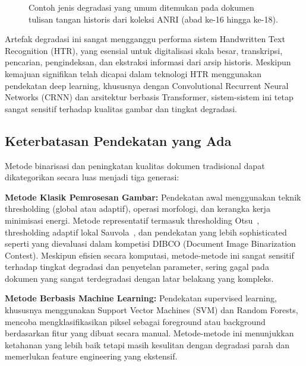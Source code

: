 \documentclass[journal]{IEEEtran}
\begin{document}
\begin{figure}[!t]
\centering
\caption{Contoh jenis degradasi yang umum ditemukan pada dokumen tulisan tangan historis dari koleksi ANRI (abad ke-16 hingga ke-18).}
\label{fig:degradation_examples}
\end{figure}

Artefak degradasi ini sangat mengganggu performa sistem Handwritten Text Recognition (HTR), yang esensial untuk digitalisasi skala besar, transkripsi, pencarian, pengindeksan, dan ekstraksi informasi dari arsip historis. Meskipun kemajuan signifikan telah dicapai dalam teknologi HTR menggunakan pendekatan deep learning, khususnya dengan Convolutional Recurrent Neural Networks (CRNN) dan arsitektur berbasis Transformer, sistem-sistem ini tetap sangat sensitif terhadap kualitas gambar dan tingkat degradasi.

\subsection{Keterbatasan Pendekatan yang Ada}

Metode binarisasi dan peningkatan kualitas dokumen tradisional dapat dikategorikan secara luas menjadi tiga generasi:

\textbf{Metode Klasik Pemrosesan Gambar:} Pendekatan awal menggunakan teknik thresholding (global atau adaptif), operasi morfologi, dan kerangka kerja minimisasi energi. Metode representatif termasuk thresholding Otsu~\cite{otsu1979threshold}, thresholding adaptif lokal Sauvola~\cite{sauvola2000adaptive}, dan pendekatan yang lebih sophisticated seperti yang dievaluasi dalam kompetisi DIBCO (Document Image Binarization Contest). Meskipun efisien secara komputasi, metode-metode ini sangat sensitif terhadap tingkat degradasi dan penyetelan parameter, sering gagal pada dokumen yang sangat terdegradasi dengan latar belakang yang kompleks.

\textbf{Metode Berbasis Machine Learning:} Pendekatan supervised learning, khususnya menggunakan Support Vector Machines (SVM) dan Random Forests, mencoba mengklasifikasikan piksel sebagai foreground atau background berdasarkan fitur yang dibuat secara manual. Metode-metode ini menunjukkan ketahanan yang lebih baik tetapi masih kesulitan dengan degradasi parah dan memerlukan feature engineering yang ekstensif.
\end{document}
